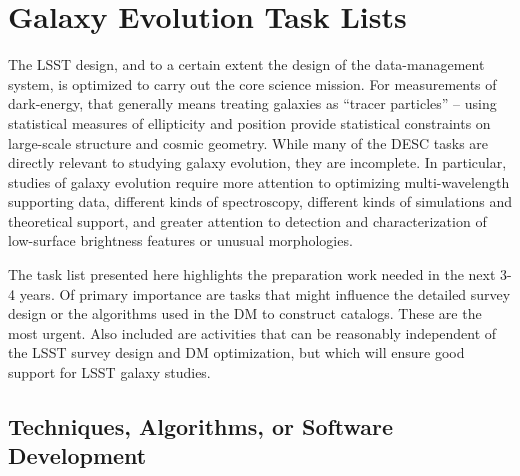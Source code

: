 
\section{Galaxy Evolution Task Lists}\label{sec:tasks:gal:intro}  

The LSST design, and to a certain extent the design of the data-management
system, is optimized to carry out the core science mission. For measurements
of dark-energy, that generally means treating galaxies as ``tracer particles'' --
using statistical measures of ellipticity and position provide statistical
constraints on large-scale structure and cosmic geometry. While many of the
DESC tasks are directly relevant to studying galaxy evolution, they are 
incomplete. In particular, studies of galaxy evolution require more attention to 
optimizing multi-wavelength supporting data, different kinds of spectroscopy, different
kinds of simulations and theoretical support, and greater attention to detection
and characterization of low-surface brightness features or unusual morphologies.

The task list presented here highlights the preparation work needed in the next 3-4
years. Of primary importance are tasks that might influence the detailed survey
design or the algorithms used in the DM to construct catalogs. These are the most
urgent. Also included are activities that can be reasonably independent of the
LSST survey design and DM optimization, but which will ensure good support for
LSST galaxy studies.  

\subsection{Techniques, Algorithms, or Software Development} \label{sec:tasks:gal:techniques_and_algorithms}

